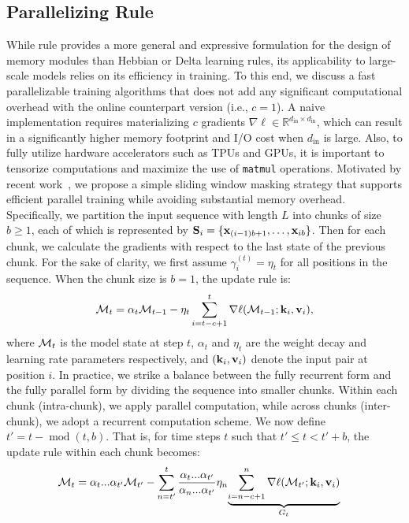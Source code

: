 \subsection{Parallelizing \learningrule{} Rule}\label{sec:parallelization}
While \learningrule{} rule provides a more general and expressive formulation for the design of memory modules than Hebbian or Delta learning rules, its applicability to large-scale models relies on its efficiency in training. To this end, we discuss a fast parallelizable training algorithms that does not add any significant computational overhead with the online counterpart version (i.e., $c = 1$). A  naive implementation requires materializing \( c \) gradients \( \nabla \ell \in \mathbb{R}^{d_{\text{in}} \times d_{\text{in}}} \), which can result in a significantly higher memory footprint and I/O cost when \( d_{\text{in}} \) is large. Also, to fully utilize hardware accelerators such as TPUs and GPUs, it is important to tensorize computations and maximize the use of \texttt{matmul} operations. Motivated by recent work~\citep{behrouz2024titans, sun2024learning}, we propose a simple sliding window masking strategy that supports efficient parallel training while avoiding substantial memory overhead. Specifically, we partition the input sequence with length $L$ into chunks of size \( b  \geq 1 \), each of which is represented by $\mathbf{S}_i = \{ \mathbf{x}_{(i-1)b+1}, \dots, \mathbf{x}_{i b}\}$. Then for each chunk, we calculate the gradients with respect to the last state of the previous chunk. For the sake of clarity, we first assume \( \gamma^{(t)}_i =  \eta_t \) for all positions in the sequence. When the chunk size is \( b = 1 \), the update rule is:
\begin{align}
    \mathcal{M}_t = \alpha_t \mathcal{M}_{t-1} - \eta_t \sum_{i=t-c+1}^{t} \nabla \ell(\mathcal{M}_{t-1}; \mathbf{k}_i, \mathbf{v}_i),
\end{align}
where \( \mathcal{M}_t \) is the model state at step \( t \), \( \alpha_t \) and \( \eta_t \) are the weight decay and learning rate parameters respectively, and \( (\mathbf{k}_i, \mathbf{v}_i) \) denote the input pair at position \( i \). In practice, we strike a balance between the fully recurrent form and the fully parallel form by dividing the sequence into smaller chunks. Within each chunk (intra-chunk), we apply parallel computation, while across chunks (inter-chunk), we adopt a recurrent computation scheme. We now define \( t' = t - \operatorname{mod}(t, b) \). That is, for time steps \( t \) such that \( t' \leq t < t' + b \), the update rule within each chunk becomes:
\begin{align} \label{eq:omega_chunk_update_rule}
    &\mathcal{M}_t = \alpha_t ... \alpha_{t'} \mathcal{M}_{t'} - \sum^{t}_{n=t'} \frac{\alpha_t ... \alpha_{t'}}{\alpha_n ... \alpha_{t'}}\eta_n \underset{G_t}{\underbrace{\sum^{n}_{i=n-c+1}\nabla \ell(\mathcal{M}_{t'}; \mathbf{k}_i, \mathbf{v}_i)}}
\end{align}
